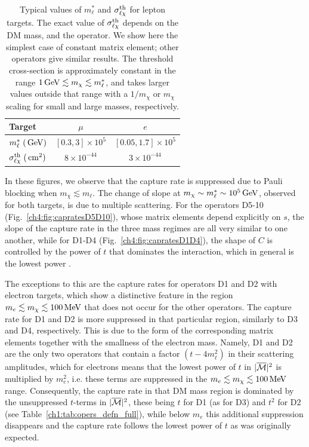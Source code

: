 \begin{table}[t!bp]
    \centering
    \begin{tabular}{l c c}
    \toprule
    Target & $\mu$ & $e$  \\
    \midrule\midrule
    $m_\ell^*\; ({\rm \,GeV})$  & $[0.3,3] \times 10^{5}$ & $[0.05,1.7] \times 10^{5}$  \\
    $\sigma^{\rm th}_{\ell\chi}\; ({\rm \,cm}^2)$ &  $8\times 10^{-44}$ & $3\times 10^{-44}$ \\
    \bottomrule
    \end{tabular} 
    \caption[Typical values of $m_\ell^*$ and $\sigmathl$ for lepton targets. ]{Typical values of $m_\ell^*$ and $\sigmathl$ for lepton targets. 
    The exact value of $\sigmathl$ depends on the DM mass, and the operator. We show here the simplest case of constant matrix element; other operators give similar results. The threshold cross-section is approximately constant in the range $1{\rm \,GeV}\lesssim m_\chi\lesssim m_\ell^*$, and takes larger values outside that range with a $1/m_\chi$ or $m_\chi$ scaling for small and large masses, respectively. }
    \label{ch4:tab:mstarsigma}
    \end{table} 

In these figures, we observe that the capture rate is suppressed due to Pauli blocking when $m_\chi \lesssim m_\ell$. The change of slope at $m_\chi\sim m_\ell^* \sim 10^5{\rm \,GeV}$, observed for both targets, is due to multiple scattering. 
For the operators D5-10 (Fig.~\ref{ch4:fig:capratesD5D10}), whose matrix elements depend explicitly on $s$,  the slope of the capture rate in the three mass regimes are all very similar to one another, while for D1-D4 (Fig.~\ref{ch4:fig:capratesD1D4}), the shape of $C$ is controlled by the power of $t$ that dominates the interaction, which in general is the lowest power \cite{Bell:2020jou_sep_ImprovedTreatmentDark}. 

The exceptions to this are the capture rates for operators D1 and D2 with electron targets, which show a distinctive feature in the region $m_e\lesssim m_\chi\lesssim 100{\rm \,MeV}$ that does not occur for the other operators.  
The capture rate for D1 and D2 is more suppressed in that particular region, similarly to D3 and D4, respectively. This is due to the form of the corresponding matrix elements together with the smallness of the electron mass. Namely, 
D1 and D2 are the only two operators that contain a factor $(t-4 m_\ell^2)$ in their scattering amplitudes, which for electrons means that the lowest power of $t$ in $|\overline{\mathcal M}|^2$ is multiplied by $m_e^2$, i.e. these terms are suppressed in the $m_e \lesssim m_\chi\lesssim 100{\rm \,MeV}$ range. Consequently, the capture rate in that DM mass region is dominated by the unsuppressed $t$-terms  in $|\overline{\mathcal M}|^2$, these being $t$  for D1 (as for D3) and $t^2$ for D2 (see Table~\ref{ch1:tab:opers_defn_full}), while below $m_e$ this additional suppression disappears and the capture rate follows the lowest power of $t$ as was originally expected. 

